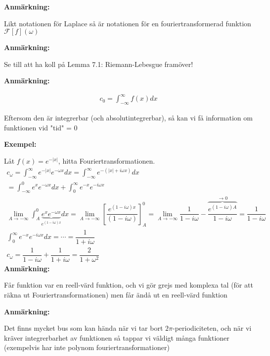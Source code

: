 \par\bigskip
\noindent\textbf{Anmärkning:}\par
\noindent Likt notationen för Laplace så är notationen för en fouriertransformerad funktion $\mathcal{F}[f](\omega)$ 
\par\bigskip
\noindent\textbf{Anmärkning:}\par
\noindent Se till att ha koll på Lemma 7.1: Riemann-Lebesgue framöver!
\par\bigskip
\noindent\textbf{Anmärkning:}\par
\begin{equation*}
  \begin{gathered}
    c_0 = \int_{-\infty}^{\infty}f(x)dx
  \end{gathered}
\end{equation*}
\par\bigskip
\noindent Eftersom den är integrerbar (och absolutintegrerbar), så kan vi få information om funktionen vid "tid" = 0 
\par\bigskip
\noindent\textbf{Exempel:}\par
\noindent Låt $f(x) = e^{-\left|x\right|}$, hitta Fouriertransformationen.
\begin{equation*}
  \begin{gathered}
    c_\omega = \int_{-\infty}^{\infty}e^{-\left|x\right|}e^{-\omega x}dx = \int_{-\infty}^{\infty}e^{-(\left|x\right|+i\omega x)} dx\\
    = \int_{-\infty}^{0}e^{x}e^{-\omega x}dx + \int_{0}^{\infty}e^{-x}e^{-i\omega x}\\
    \lim_{A\to-\infty}\int_{A}^{0}\underbrace{e^{x}e^{-\omega x}}_{\text{$e^{(1-i\omega)x}$}}dx = \lim_{A\to-\infty}\left[\dfrac{e^{(1-i\omega)x}}{(1-i\omega)}\right]_{A}^0 = \lim_{A\to-\infty}\dfrac{1}{1-i\omega}-\overbrace{\dfrac{e^{(1-i\omega)A}}{1-i\omega}}^{\text{$\to0$}} = \dfrac{1}{1-i\omega}\\
    \int_{0}^{\infty}e^{-x}e^{-i\omega x}dx = \cdots = \dfrac{1}{1+i\omega}\\
    c_\omega = \dfrac{1}{1-i\omega} + \dfrac{1}{1+i\omega} = \dfrac{2}{1+\omega^2}
  \end{gathered}
\end{equation*}
\newpage
\noindent\textbf{Anmärkning:}\par
\noindent Får funktion var en reell-värd funktion, och vi gör grejs med komplexa tal (för att räkna ut Fouriertransformationen) men får ändå ut en reell-värd funktion
\par\bigskip
\noindent\textbf{Anmärkning:}\par
\noindent Det finns mycket bus som kan hända när vi tar bort $2\pi$-periodiciteten, och när vi kräver integrerbarhet av funktionen så tappar vi väldigt många funktioner (exempelvis har inte polynom fouriertransformationer)
\par\bigskip
